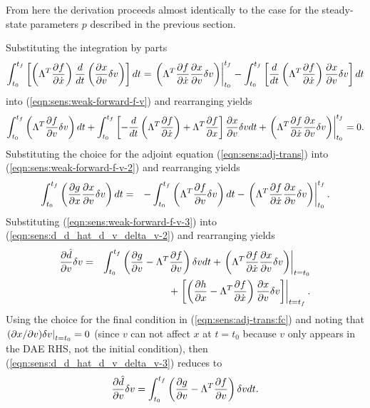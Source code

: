 \documentclass[pdf,ps2pdf,11pt]{SANDreport}
\begin{document}
From here the derivation proceeds almost identically to the case for the
steady-state parameters $p$ described in the previous section.

Substituting the integration by parts
%
\begin{equation}
\int_{t_0}^{t_f} \left[ \left( \Lambda^T \displaystyle{\frac{\partial f}{\partial \dot{x}}} \right) \frac{d}{dt}\left( \displaystyle{\frac{\partial x}{\partial v}} \delta v \right) \right] dt
= \left. \left( \Lambda^T \displaystyle{\frac{\partial f}{\partial \dot{x}}} \displaystyle{\frac{\partial x}{\partial v}} \delta v \right) \right|_{t_0}^{t_f}
- \int_{t_0}^{t_f} \left[ \frac{d}{dt}\left( \Lambda^T \displaystyle{\frac{\partial f}{\partial \dot{x}}} \right) \displaystyle{\frac{\partial x}{\partial v}} \delta v \right] dt
\end{equation}
%
into (\ref{eqn:sens:weak-forward-f-v}) and rearranging yields
%
\begin{equation}
\int_{t_0}^{t_f} \left( \Lambda^T \displaystyle{\frac{\partial f}{\partial v}} \delta v \right) dt
+ \int_{t_0}^{t_f} \left[
    - \frac{d}{dt}\left( \Lambda^T \displaystyle{\frac{\partial f}{\partial \dot{x}}} \right)
    + \Lambda^T \displaystyle{\frac{\partial f}{\partial x}}
  \right] \displaystyle{\frac{\partial x}{\partial v}} \delta v dt
+ \left. \left( \Lambda^T \displaystyle{\frac{\partial f}{\partial \dot{x}}} \displaystyle{\frac{\partial x}{\partial v}} \delta v \right) \right|_{t_0}^{t_f}
= 0.
\label{eqn:sens:weak-forward-f-v-2}
\end{equation}
%
Substituting the choice for the adjoint equation
(\ref{eqn:sens:adj-trans}) into
(\ref{eqn:sens:weak-forward-f-v-2}) and rearranging yields
%
\begin{eqnarray}
\int_{t_0}^{t_f} \left( \displaystyle{\frac{\partial g}{\partial x}} \displaystyle{\frac{\partial x}{\partial v}} \delta v \right) dt
& = &
- \int_{t_0}^{t_f} \left( \Lambda^T \displaystyle{\frac{\partial f}{\partial v}} \delta v \right) dt
- \left. \left( \Lambda^T \displaystyle{\frac{\partial f}{\partial \dot{x}}} \displaystyle{\frac{\partial x}{\partial v}} \delta v \right) \right|^{t_f}_{t_0}.
\label{eqn:sens:weak-forward-f-v-3}
\end{eqnarray}
%
Substituting (\ref{eqn:sens:weak-forward-f-v-3}) into
(\ref{eqn:sens:d_d_hat_d_v_delta_v-2}) and rearranging
yields
%
\begin{eqnarray}
\displaystyle{\frac{\partial \hat{d}}{\partial v}} \delta v 
& = &
\int_{t_0}^{t_f} \left( \displaystyle{\frac{\partial g}{\partial v}} -  \Lambda^T \displaystyle{\frac{\partial f}{\partial v}} \right) \delta v dt
+ \left. \left( \Lambda^T \displaystyle{\frac{\partial f}{\partial \dot{x}}} \displaystyle{\frac{\partial x}{\partial v}} \delta v \right) \right|_{t=t_0}
\nonumber \\
& &
+ \left. \left[ \left(
    \displaystyle{\frac{\partial h}{\partial x}} - \Lambda^T \displaystyle{\frac{\partial f}{\partial \dot{x}}}
  \right)  \displaystyle{\frac{\partial x}{\partial v}} \delta v \right] \right|_{t=t_f}.
\label{eqn:sens:d_d_hat_d_v_delta_v-3}
\end{eqnarray}
%
Using the choice for the final condition in (\ref{eqn:sens:adj-trans:fc}) and
noting that $\left.(\partial x / \partial v)\delta v\right|_{t=t_0} = 0$ (since $v$ can not
affect $x$ at $t=t_0$ because $v$ only appears in the DAE RHS, not the initial
condition), then (\ref{eqn:sens:d_d_hat_d_v_delta_v-3}) reduces to
%
\begin{equation}
\displaystyle{\frac{\partial \hat{d}}{\partial v}} \delta v 
 = \int_{t_0}^{t_f} \left( \displaystyle{\frac{\partial g}{\partial v}} - \Lambda^T \displaystyle{\frac{\partial f}{\partial v}} \right) \delta v dt.
\label{eqn:sens:d_d_hat_d_v_delta_v-final}
\end{equation}
\end{document}
